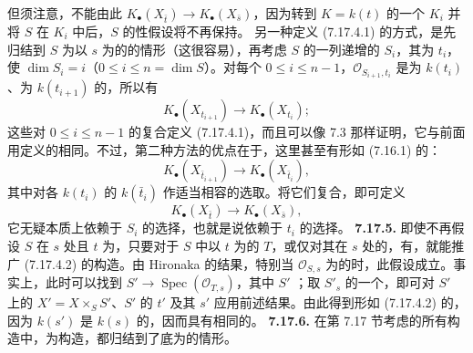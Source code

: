 但须注意，不能由此 $K_\bullet(X_{\bar t})\to K_\bullet(X_{\bar s})$，因为转到 $K=k(t)$ 的一个 $K_i$ 并将 $S$ 在 $K_i$ 中后，$S$ 的性假设将不再保持。
另一种定义 (7.17.4.1) 的方式，是先归结到 $S$ 为以 $s$ 为的的情形（这很容易），再考虑 $S$ 的一列递增的 $S_i$，其为 $t_i$，使 $\dim S_i=i$（$0\leq i\leq n=\dim S$）。对每个 $0\leq i\leq n-1$，$\mathcal O_{S_{i+1},t_i}$ 是为 $k(t_i)$、为 $k(t_{i+1})$ 的，所以有
\[K_\bullet(X_{t_{i+1}})\longrightarrow K_\bullet(X_{t_i});\]
这些对 $0\leq i\leq n-1$ 的复合定义 (7.17.4.1)，而且可以像 7.3 那样证明，它与前面用定义的相同。不过，第二种方法的优点在于，这里甚至有形如 (7.16.1) 的：
\[K_\bullet(X_{\bar t_{i+1}})\longrightarrow K_\bullet(X_{\bar t_i}),\]
其中对各 $k(t_i)$ 的 $k(\bar t_i)$ 作适当相容的选取。将它们复合，即可定义
\[K_\bullet(X_{\bar t})\longrightarrow K_\bullet(X_{\bar s}),\tag{7.17.4.2}\]
它无疑本质上依赖于 $S_i$ 的选择，也就是说依赖于 $t_i$ 的选择。
\textbf{7.17.5.} 即使不再假设 $S$ 在 $s$ 处且 $t$ 为，只要对于 $S$ 中以 $t$ 为的 $T$，或仅对其在 $s$ 处的，有，就能推广 (7.17.4.2) 的构造。由 Hironaka 的结果，特别当 $\mathcal O_{S,s}$ 为的时，此假设成立。事实上，此时可以找到 $S'\to\operatorname{Spec}(\mathcal O_{T,s})$，其中 $S'$ ；取 $S'_s$ 的一个，即可对 $S'$ 上的 $X'=X\times_S S'$、$S'$ 的 $t'$ 及其 $s'$ 应用前述结果。由此得到形如 (7.17.4.2) 的，因为 $k(s')$ 是 $k(s)$ 的，因而具有相同的。
\textbf{7.17.6.} 在第 7.17 节考虑的所有构造中，为构造，都归结到了底为的情形。
